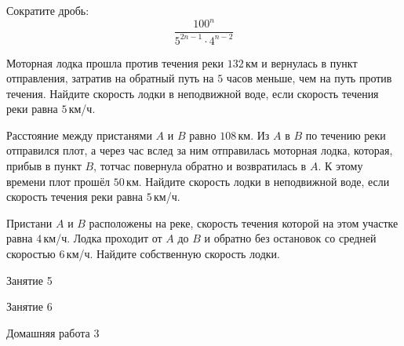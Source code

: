\begin{homework}[number=2]
	\begin{listofex}
		\item Сократите дробь: \[\dfrac{100^n}{5^{2n-1}\cdot4^{n-2}}\]
		\item Моторная лодка прошла против течения реки \( 132 \) км и вернулась в пункт отправления, затратив на обратный путь на \( 5 \) часов меньше, чем на путь против течения. Найдите скорость лодки в неподвижной воде, если скорость течения реки равна \( 5 \) км/ч.
		\item Расстояние между пристанями \( A \) и \( B \) равно \( 108 \) км. Из \( A \) в \( B \) по течению реки отправился плот, а через час вслед за ним отправилась моторная лодка, которая, прибыв в пункт \( B \), тотчас повернула обратно и возвратилась в \( A \). К этому времени плот прошёл \( 50 \) км. Найдите скорость лодки в неподвижной воде, если скорость течения реки равна \( 5 \) км/ч.
		\item Пристани \( A \) и \( B \) расположены на реке, скорость течения которой на этом участке равна \( 4 \) км/ч. Лодка проходит от \( A \) до \( B \) и обратно без остановок со средней скоростью \( 6 \) км/ч. Найдите собственную скорость лодки.
	\end{listofex}
\end{homework}

\begin{class}[number=5]
	\begin{listofex}
		\item Занятие 5
	\end{listofex}
\end{class}

\begin{class}[number=6]
	\begin{listofex}
		\item Занятие 6
	\end{listofex}
\end{class}

\begin{homework}[number=3]
	\begin{listofex}
		\item Домашняя работа 3
	\end{listofex}
\end{homework}

